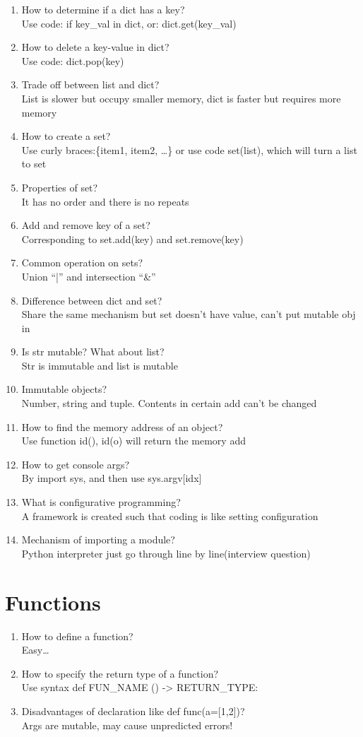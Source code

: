 \documentclass[10pt,a4paper,oneside]{article}
\begin{document}
\begin{enumerate}[1.]
\item How to determine if a dict has a key?\\
Use code: if key\_val in dict, or: dict.get(key\_val)
\item How to delete a key-value in dict?\\
Use code: dict.pop(key)
\item Trade off between list and dict?\\
List is slower but occupy smaller memory, dict is faster but requires more memory
\item How to create a set?\\
Use curly braces:\{item1, item2, \dots\} or use code set(list), which will turn a list to set
\item Properties of set?\\
It has no order and there is no repeats
\item Add and remove key of a set?\\
Corresponding to set.add(key) and set.remove(key)
\item Common operation on sets?\\
Union ``|'' and intersection ``\&''
\item Difference between dict and set?\\
Share the same mechanism but set doesn’t have value, can't put mutable obj in
\item Is str mutable? What about list?\\
Str is immutable and list is mutable
\item Immutable objects?\\
Number, string and tuple. Contents in certain add can't be changed
\item How to find the memory address of an object?\\
Use function id(), id(o) will return the memory add
\item How to get console args?\\
By import sys, and then use sys.argv[idx]
\item What is configurative programming?\\
A framework is created such that coding is like setting configuration
\item Mechanism of importing a module? \\
Python interpreter just go through line by line(interview question)
\end{enumerate}
\section{Functions}
\begin{enumerate}[1.]
\item How to define a function?\\
Easy\dots
\item How to specify the return type of a function?\\
Use syntax def FUN\_NAME () -> RETURN\_TYPE:
\item Disadvantages of declaration like def func(a=[1,2])?\\
Args are mutable, may cause unpredicted errors!
\end{enumerate}
\end{document}
